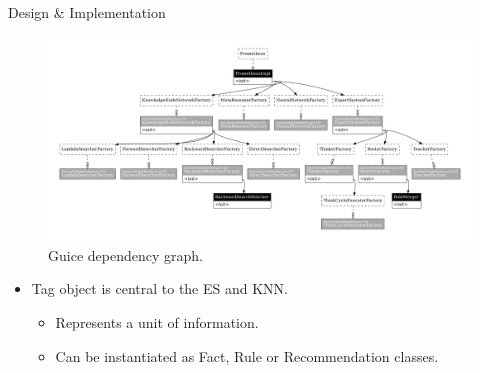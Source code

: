 \documentclass[final]{beamer} %
\begin{document}
\begin{frame}
\begin{columns}
\begin{column}{.34\textwidth}
{\begin{block}{Design \& Implementation}
					\begin{figure}[!htb]
						\centering
						\includegraphics[width=\columnwidth]{figures/guice_graph.pdf}
						\caption
						{Guice dependency graph.}
					\end{figure}
					
					\begin{itemize}
						\item Tag object is central to the ES and KNN.
						\begin{itemize}
							\item Represents a unit of information.
							\item Can be instantiated as Fact, Rule or Recommendation classes.
						\end{itemize}
					\end{itemize}
				

\end{block}}
\end{column}
\end{columns}
\end{frame}
\end{document}
